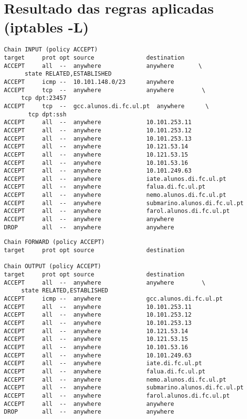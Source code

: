 \documentclass[12pt, a4paper, twoside]{report} %
\begin{document}
\section{Resultado das regras aplicadas (iptables -L)}

\begin{lstlisting}
Chain INPUT (policy ACCEPT)
target     prot opt source               destination
ACCEPT     all  --  anywhere             anywhere       \
      state RELATED,ESTABLISHED
ACCEPT     icmp --  10.101.148.0/23      anywhere
ACCEPT     tcp  --  anywhere             anywhere        \
     tcp dpt:23457
ACCEPT     tcp  --  gcc.alunos.di.fc.ul.pt  anywhere      \
       tcp dpt:ssh
ACCEPT     all  --  anywhere             10.101.253.11
ACCEPT     all  --  anywhere             10.101.253.12
ACCEPT     all  --  anywhere             10.101.253.13
ACCEPT     all  --  anywhere             10.121.53.14
ACCEPT     all  --  anywhere             10.121.53.15
ACCEPT     all  --  anywhere             10.101.53.16
ACCEPT     all  --  anywhere             10.101.249.63
ACCEPT     all  --  anywhere             iate.alunos.di.fc.ul.pt
ACCEPT     all  --  anywhere             falua.di.fc.ul.pt
ACCEPT     all  --  anywhere             nemo.alunos.di.fc.ul.pt
ACCEPT     all  --  anywhere             submarino.alunos.di.fc.ul.pt
ACCEPT     all  --  anywhere             farol.alunos.di.fc.ul.pt
ACCEPT     all  --  anywhere             anywhere
DROP       all  --  anywhere             anywhere
\end{lstlisting}
\clearpage
\begin{lstlisting}
Chain FORWARD (policy ACCEPT)
target     prot opt source               destination

Chain OUTPUT (policy ACCEPT)
target     prot opt source               destination
ACCEPT     all  --  anywhere             anywhere        \
     state RELATED,ESTABLISHED
ACCEPT     icmp --  anywhere             gcc.alunos.di.fc.ul.pt
ACCEPT     all  --  anywhere             10.101.253.11
ACCEPT     all  --  anywhere             10.101.253.12
ACCEPT     all  --  anywhere             10.101.253.13
ACCEPT     all  --  anywhere             10.121.53.14
ACCEPT     all  --  anywhere             10.121.53.15
ACCEPT     all  --  anywhere             10.101.53.16
ACCEPT     all  --  anywhere             10.101.249.63
ACCEPT     all  --  anywhere             iate.di.fc.ul.pt
ACCEPT     all  --  anywhere             falua.di.fc.ul.pt
ACCEPT     all  --  anywhere             nemo.alunos.di.fc.ul.pt
ACCEPT     all  --  anywhere             submarino.alunos.di.fc.ul.pt
ACCEPT     all  --  anywhere             farol.alunos.di.fc.ul.pt
ACCEPT     all  --  anywhere             anywhere
DROP       all  --  anywhere             anywhere
\end{lstlisting}
\end{document}
